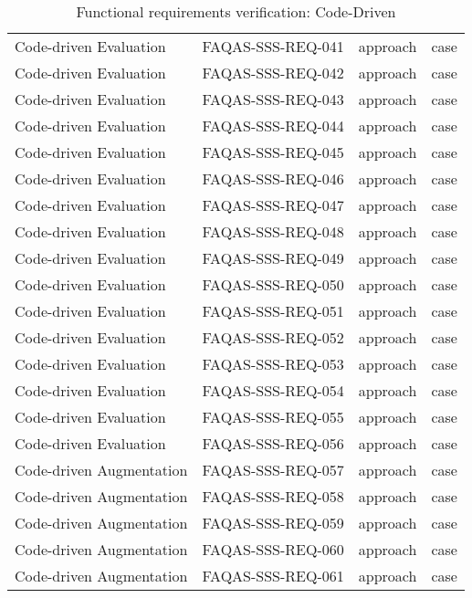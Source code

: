 \begin{table}[h!]
{\begin{tabular}{|l|l|l|l|}
Code-driven Evaluation & FAQAS-SSS-REQ-041 & approach & case \\
Code-driven Evaluation & FAQAS-SSS-REQ-042 & approach & case \\
Code-driven Evaluation & FAQAS-SSS-REQ-043 & approach & case \\
Code-driven Evaluation & FAQAS-SSS-REQ-044 & approach & case \\
Code-driven Evaluation & FAQAS-SSS-REQ-045 & approach & case \\
Code-driven Evaluation & FAQAS-SSS-REQ-046 & approach & case \\
Code-driven Evaluation & FAQAS-SSS-REQ-047 & approach & case \\
Code-driven Evaluation & FAQAS-SSS-REQ-048 & approach & case \\
Code-driven Evaluation & FAQAS-SSS-REQ-049 & approach & case \\
Code-driven Evaluation & FAQAS-SSS-REQ-050 & approach & case \\
Code-driven Evaluation & FAQAS-SSS-REQ-051 & approach & case \\
Code-driven Evaluation & FAQAS-SSS-REQ-052 & approach & case \\
Code-driven Evaluation & FAQAS-SSS-REQ-053 & approach & case \\
Code-driven Evaluation & FAQAS-SSS-REQ-054 & approach & case \\
Code-driven Evaluation & FAQAS-SSS-REQ-055 & approach & case \\
Code-driven Evaluation & FAQAS-SSS-REQ-056 & approach & case \\
Code-driven Augmentation & FAQAS-SSS-REQ-057 & approach & case \\
Code-driven Augmentation & FAQAS-SSS-REQ-058 & approach & case \\
Code-driven Augmentation & FAQAS-SSS-REQ-059 & approach & case \\
Code-driven Augmentation & FAQAS-SSS-REQ-060 & approach & case \\
Code-driven Augmentation & FAQAS-SSS-REQ-061 & approach & case \\
\hline
\end{tabular}
  }
  \caption{Functional requirements verification: Code-Driven}
  \label{tables:code}
\end{table}
